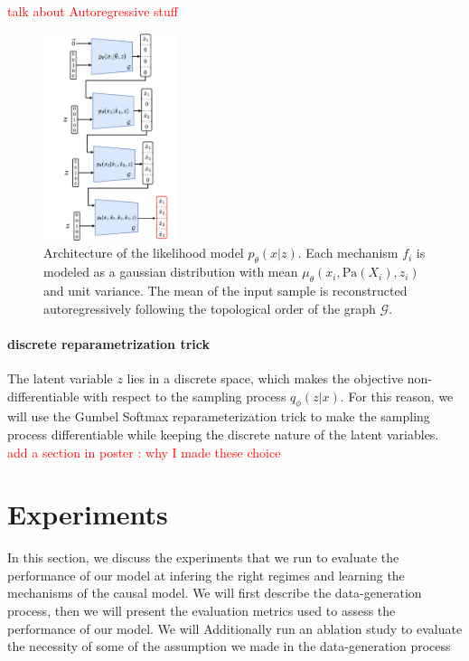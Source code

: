 \documentclass{article}
\newcommand\todo[1]{\textcolor{red}{#1}}
\begin{document}
\todo{talk about Autoregressive stuff}
\begin{figure}
\centering
    \includegraphics[width=0.35\textwidth]{images/architecture_decoder.pdf}
    \caption{Architecture of the likelihood model $p_\theta(x | z)$. Each mechanism $f_i$ is modeled as a gaussian distribution with mean $\mu_\theta(x_i, \text{Pa}(X_i), z_i)$ and unit variance. The mean of the input sample is reconstructed autoregressively following the topological order of the graph $\mathcal{G}$.}
    \label{fig:architecture_decoder}
\end{figure}
\paragraph{discrete reparametrization trick}
The latent variable $z$ lies in a discrete space, which makes the objective non-differentiable with respect to the sampling process $q_\phi(z | x)$. For this reason, we will use the Gumbel Softmax reparameterization trick \citep{jang2017categoricalreparameterizationgumbelsoftmax} to make the sampling process differentiable while keeping the discrete nature of the latent variables.
 \todo{add a section in poster  : why I made these choice}
\section{Experiments}\label{subsec:Experiments}
In this section, we discuss the experiments that we run to evaluate the performance of our model at infering the right regimes and learning the mechanisms of the causal model. We will first describe the data-generation process, then we will present the evaluation metrics used to assess the performance of our model. We will Additionally run an ablation study to evaluate the necessity of some of the assumption we made in the data-generation process
\end{document}
